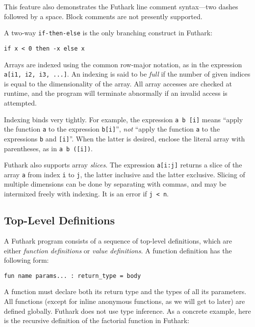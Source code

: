 \documentclass[11pt]{book}
\begin{document}
\noindent
This feature also demonstrates the Futhark line comment syntax---two dashes
followed by a space.  Block comments are not presently supported.

A two-way \texttt{if-then-else} is the only branching construct in
Futhark:

\begin{lstlisting}
if x < 0 then -x else x
\end{lstlisting}

Arrays are indexed using the common row-major notation, as in the expression
\texttt{a[i1, i2, i3, ...]}.  An indexing is said to be \textit{full} if
the number of given indices is equal to the dimensionality of the
array.  All array accesses are checked at runtime, and the program
will terminate abnormally if an invalid access is attempted.

Indexing binds very tightly.  For example, the expression
\texttt{a~b~[i]} means ``apply the function \texttt{a} to the
expression \texttt{b[i]}'', \textit{not} ``apply the function
\texttt{a} to the expressions \texttt{b} and \texttt{[i]}''.  When the
latter is desired, enclose the literal array with parentheses, as in
\texttt{a~b~([i])}.

Futhark also supports array \textit{slices}.  The expression
\texttt{a[i:j]} returns a slice of the array \texttt{a} from index
\texttt{i} to \texttt{j}, the latter inclusive and the latter
exclusive.  Slicing of multiple dimensions can be done by separating
with commas, and may be intermixed freely with indexing.  It is an
error if \texttt{j < n}.

\subsection{Top-Level Definitions}
\label{sec:function-declarations}

A Futhark program consists of a sequence of top-level definitions,
which are either \textit{function definitions} or \textit{value
  definitions}.  A function definition has the following form:

\begin{lstlisting}
fun name params... : return_type = body
\end{lstlisting}

\noindent
A function must declare both its return type and the types of all its
parameters.  All functions (except for inline anonymous functions, as
we will get to later) are defined globally.  Futhark does not use type
inference.  As a concrete example, here is the recursive definition of
the factorial function in Futhark:
\end{document}
